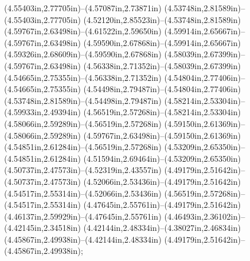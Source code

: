 (4.55403in,2.77705in)--(4.57087in,2.73871in) (4.53748in,2.81589in)--(4.55403in,2.77705in) (4.52120in,2.85523in)--(4.53748in,2.81589in) (4.59767in,2.63498in)--(4.61522in,2.59650in) (4.59914in,2.65667in)--(4.59767in,2.63498in) (4.59590in,2.67868in)--(4.59914in,2.65667in) (4.59326in,2.68609in)--(4.59590in,2.67868in) (4.58039in,2.67399in)--(4.59767in,2.63498in) (4.56338in,2.71352in)--(4.58039in,2.67399in) (4.54665in,2.75355in)--(4.56338in,2.71352in) (4.54804in,2.77406in)--(4.54665in,2.75355in) (4.54498in,2.79487in)--(4.54804in,2.77406in) (4.53748in,2.81589in)--(4.54498in,2.79487in) (4.58214in,2.53304in)--(4.59933in,2.49394in) (4.56519in,2.57268in)--(4.58214in,2.53304in) (4.58066in,2.59289in)--(4.56519in,2.57268in) (4.59150in,2.61369in)--(4.58066in,2.59289in) (4.59767in,2.63498in)--(4.59150in,2.61369in) (4.54851in,2.61284in)--(4.56519in,2.57268in) (4.53209in,2.65350in)--(4.54851in,2.61284in) (4.51594in,2.69464in)--(4.53209in,2.65350in) (4.50737in,2.47573in)--(4.52319in,2.43557in) (4.49179in,2.51642in)--(4.50737in,2.47573in) (4.52066in,2.53436in)--(4.49179in,2.51642in) (4.54517in,2.55314in)--(4.52066in,2.53436in) (4.56519in,2.57268in)--(4.54517in,2.55314in) (4.47645in,2.55761in)--(4.49179in,2.51642in) (4.46137in,2.59929in)--(4.47645in,2.55761in) (4.46493in,2.36102in)--(4.42145in,2.34518in) (4.42144in,2.48334in)--(4.38027in,2.46834in) (4.45867in,2.49938in)--(4.42144in,2.48334in) (4.49179in,2.51642in)--(4.45867in,2.49938in);
